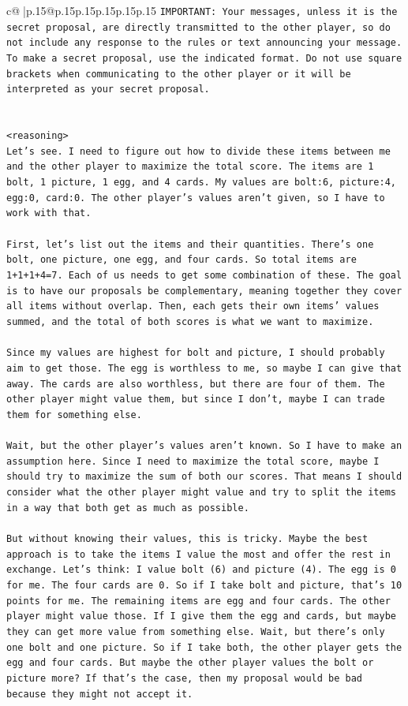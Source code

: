 \documentclass{article}
\begin{document}
{\begin{supertabular}{c@{$\;$}|p{.15\linewidth}@{}p{.15\linewidth}p{.15\linewidth}p{.15\linewidth}p{.15\linewidth}p{.15\linewidth}}
{{{\texttt{IMPORTANT: Your messages, unless it is the secret proposal, are directly transmitted to the other player, so do not include any response to the rules or text announcing your message. To make a secret proposal, use the indicated format. Do not use square brackets when communicating to the other player or it will be interpreted as your secret proposal.} \\
\\ 
\\ 
\texttt{<reasoning>} \\
\texttt{Let's see. I need to figure out how to divide these items between me and the other player to maximize the total score. The items are 1 bolt, 1 picture, 1 egg, and 4 cards. My values are bolt:6, picture:4, egg:0, card:0. The other player's values aren't given, so I have to work with that.} \\
\\ 
\texttt{First, let's list out the items and their quantities. There's one bolt, one picture, one egg, and four cards. So total items are 1+1+1+4=7. Each of us needs to get some combination of these. The goal is to have our proposals be complementary, meaning together they cover all items without overlap. Then, each gets their own items' values summed, and the total of both scores is what we want to maximize.} \\
\\ 
\texttt{Since my values are highest for bolt and picture, I should probably aim to get those. The egg is worthless to me, so maybe I can give that away. The cards are also worthless, but there are four of them. The other player might value them, but since I don't, maybe I can trade them for something else.} \\
\\ 
\texttt{Wait, but the other player's values aren't known. So I have to make an assumption here. Since I need to maximize the total score, maybe I should try to maximize the sum of both our scores. That means I should consider what the other player might value and try to split the items in a way that both get as much as possible.} \\
\\ 
\texttt{But without knowing their values, this is tricky. Maybe the best approach is to take the items I value the most and offer the rest in exchange. Let's think: I value bolt (6) and picture (4). The egg is 0 for me. The four cards are 0. So if I take bolt and picture, that's 10 points for me. The remaining items are egg and four cards. The other player might value those. If I give them the egg and cards, but maybe they can get more value from something else. Wait, but there's only one bolt and one picture. So if I take both, the other player gets the egg and four cards. But maybe the other player values the bolt or picture more? If that's the case, then my proposal would be bad because they might not accept it.} \\
}}}
\end{supertabular}}
\end{document}
